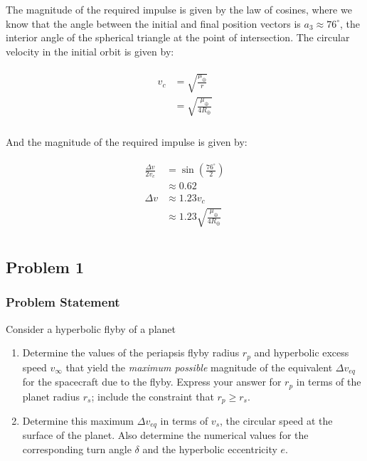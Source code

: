 \documentclass[
]{article}
\providecommand{\tightlist}{%
  \setlength{\itemsep}{0pt}\setlength{\parskip}{0pt}}
\begin{document}
The magnitude of the required impulse is given by the law of cosines,
where we know that the angle between the initial and final position
vectors is \(a_3 \approx 76^\circ\), the interior angle of the spherical
triangle at the point of intersection. The circular velocity in the
initial orbit is given by:

\[\begin{aligned}
\begin{aligned}
    v_c &= \sqrt{\frac{\mu_\oplus}{r}} \\
    &= \sqrt{\frac{\mu_\oplus}{4R_\oplus}} \\
\end{aligned}
\end{aligned}\]

And the magnitude of the required impulse is given by:

\[\begin{aligned}
\begin{aligned}
    \frac{\Delta v}{2 v_c} &= \sin\left( \frac{76^\circ}{2} \right) \\
    &\approx 0.62 \\
    \Delta v &\approx 1.23 v_c \\
    &\approx 1.23 \sqrt{\frac{\mu_\oplus}{4R_\oplus}} \\
\end{aligned}
\end{aligned}\]

\subsection{Problem 1}\label{problem-1}

\subsubsection{Problem Statement}\label{problem-statement-2}

Consider a hyperbolic flyby of a planet

\begin{enumerate}
\tightlist
\item
  Determine the values of the periapsis flyby radius \(r_p\) and
  hyperbolic excess speed \(v_\infty\) that yield the \emph{maximum
  possible} magnitude of the equivalent \(\Delta v_{eq}\) for the
  spacecraft due to the flyby. Express your answer for \(r_p\) in terms
  of the planet radius \(r_s\); include the constraint that
  \(r_p \geq r_s\).
\item
  Determine this maximum \(\Delta v_{eq}\) in terms of \(v_s\), the
  circular speed at the surface of the planet. Also determine the
  numerical values for the corresponding turn angle \(\delta\) and the
  hyperbolic eccentricity \(e\).
\end{enumerate}
\end{document}
